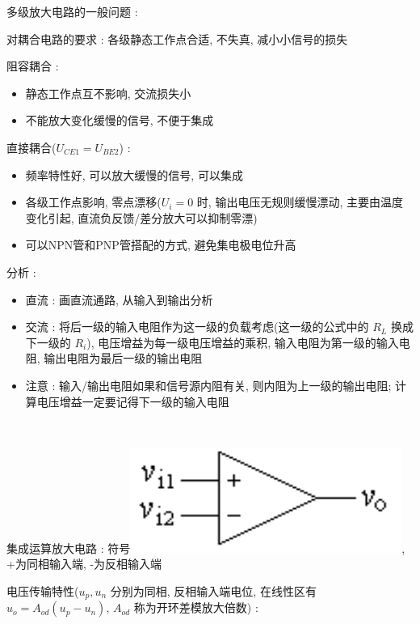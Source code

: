 \documentclass[UTF8, 12pt]{ctexart}
\begin{document}
	\noindent
	多级放大电路的一般问题 :

	对耦合电路的要求 : 各级静态工作点合适, 不失真, 减小小信号的损失

	阻容耦合 :
	\begin{itemize}[leftmargin = 4em]
		\item 静态工作点互不影响, 交流损失小
		\item 不能放大变化缓慢的信号, 不便于集成
	\end{itemize}

	直接耦合($ U_ {CE1} = U_{BE2}$) :
	\begin{itemize}[leftmargin = 4em]
		\item 频率特性好, 可以放大缓慢的信号, 可以集成
		\item 各级工作点影响, 零点漂移($ U_{i} = 0 $ 时, 输出电压无规则缓慢漂动, 主要由温度变化引起, 直流负反馈/差分放大可以抑制零漂)
		\item 可以NPN管和PNP管搭配的方式, 避免集电极电位升高
	\end{itemize}

	分析 :
	\begin{itemize}[leftmargin = 4em]
		\item 直流 : 画直流通路, 从输入到输出分析
		\item 交流 : 将后一级的输入电阻作为这一级的负载考虑(这一级的公式中的 $ R_{L} $ 换成下一级的 $ R_{i} $), 电压增益为每一级电压增益的乘积, 输入电阻为第一级的输入电阻, 输出电阻为最后一级的输出电阻
		\item 注意 : 输入/输出电阻如果和信号源内阻有关, 则内阻为上一级的输出电阻; 计算电压增益一定要记得下一级的输入电阻
	\end{itemize}

	~

	\noindent
	集成运算放大电路 : 符号\includegraphics[scale = 0.2]{03/集成运算放大器符号.png}, +为同相输入端, -为反相输入端

	电压传输特性($ u_{p}, u_{n} $ 分别为同相, 反相输入端电位, 在线性区有 $ u_{o} = A_{od}(u_{p}-u_{n}) $, $ A_{od} $ 称为开环差模放大倍数) :
\end{document}

